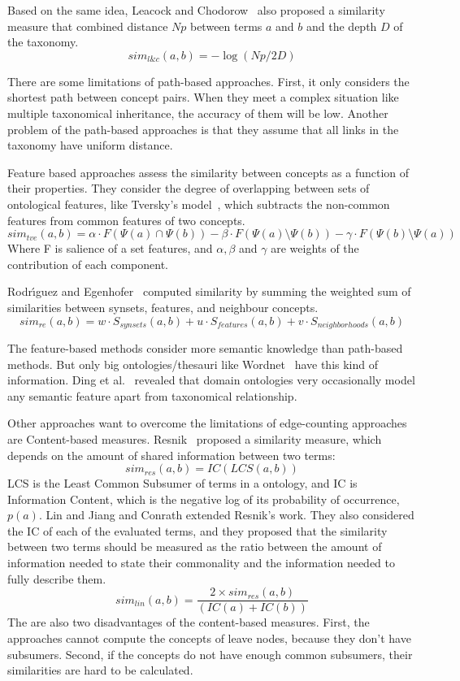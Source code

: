 Based on the same idea, Leacock and Chodorow~\cite{leacock1998combining} also proposed a similarity measure that combined distance $Np$ between terms $a$ and $b$ and the depth $D$ of the taxonomy.
$$ sim_{l\&c}(a,b) = -\log (Np/ 2D) $$

There are some limitations of path-based approaches. First, it only considers the shortest path between concept pairs. When they meet a complex situation like multiple taxonomical inheritance, the accuracy of them will be low. Another problem of the path-based approaches is that they assume that all links in the taxonomy have uniform distance.



Feature based approaches assess the similarity between concepts as a function of their properties. They consider the degree of overlapping between sets of ontological features, like Tversky's model~\cite{tverskyfeatures}, which subtracts the non-common features from common features of two concepts.
$$  sim_{tve}(a,b) = \alpha \cdot F \left( \Psi(a) \cap   \Psi(b)  \right) - \beta  \cdot F \left( \Psi(a) \setminus   \Psi(b)  \right) - \gamma \cdot F \left( \Psi(b) \setminus   \Psi(a)  \right)  $$
Where F is salience of a set features, and $\alpha, \beta$ and $\gamma$ are weights of the contribution of each component.

Rodr{\'\i}guez and Egenhofer~\cite{rodriguez2003determining} computed similarity by summing the weighted sum of similarities between synsets, features, and neighbour concepts.
$$ sim_{re}(a,b) = w \cdot S_{synsets}(a,b) + u \cdot S_{features}(a,b) + v \cdot S_{neighborhoods}(a,b) $$

The feature-based methods consider more semantic knowledge than path-based methods. But only big ontologies/thesauri like Wordnet~\cite{miller1995wordnet} have this kind of information. Ding et al.~\cite{ding2004swoogle} revealed that domain ontologies very occasionally model any semantic feature apart from taxonomical relationship.


Other approaches want to overcome the limitations of edge-counting approaches are Content-based measures. Resnik~\cite{resnik1995using} proposed a similarity measure, which depends on the amount of shared information between two terms:
$$ sim_{res}(a,b) = IC(LCS(a,b))$$
LCS is the Least Common Subsumer of terms in a ontology, and IC is Information Content, which is the negative log of its probability of occurrence, $p(a)$. Lin \cite{lin1998information} and Jiang and Conrath \cite{jiang1997semantic} extended Resnik's work. They also considered the IC of each of the evaluated terms, and they proposed that the similarity between two terms should be measured as the ratio between the amount of information needed to state their commonality and the information needed to fully describe them.
$$ sim_{lin}(a,b)=\frac{2 \times sim_{res}(a,b)}{(IC(a)+IC(b))}$$
The are also two disadvantages of the content-based measures. First, the approaches cannot compute the concepts of leave nodes, because they don't have subsumers. Second, if the concepts do not have enough common subsumers, their similarities are hard to be calculated.


